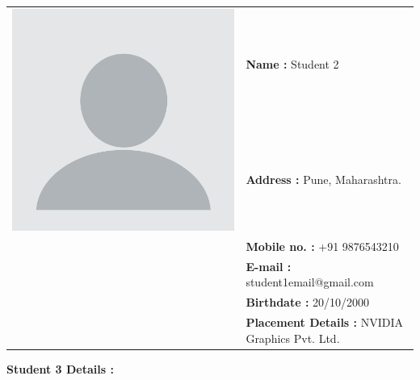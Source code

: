 \documentclass{report} %
\begin{document}
\begin{appendices}
		\centering
		\begin{tabular}{ll}
			\multirow{2}{*}{\includegraphics[scale=0.05]{images/student2.jpg}} & \textbf{Name :} Student 2 \\
			& \textbf{Address :} Pune, Maharashtra.  \\
			& \textbf{Mobile no. :} +91 9876543210  \\
			& \textbf{E-mail :} student1email@gmail.com  \\
			& \textbf{Birthdate :} 20/10/2000  \\
			& \textbf{Placement Details :} NVIDIA Graphics Pvt. Ltd.  \\
		\end{tabular}
		
		\flushleft
		\textbf{Student 3 Details :}
		\vspace{0.5cm}
		

\end{appendices}
\end{document}
